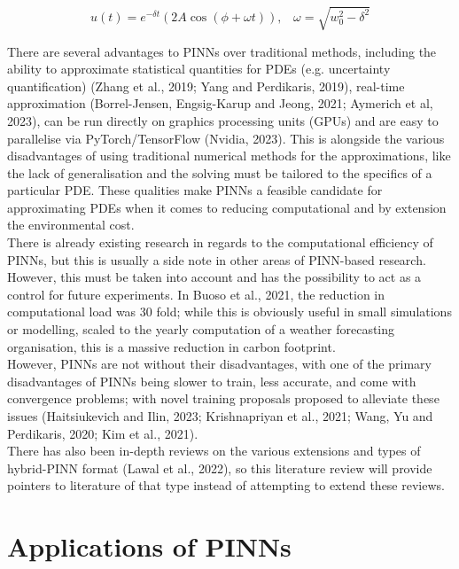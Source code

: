 \documentclass[12pt, openany]{book}
\begin{document}
\[
u(t)=e^{-\delta t}(2A\cos(\phi + \omega t)), \hspace{10pt} \omega = \sqrt{w_{0}^2-\delta^2}
\]

There are several advantages to PINNs over traditional methods, including the ability to approximate statistical quantities for PDEs (e.g. uncertainty quantification) (Zhang et al., 2019; Yang and Perdikaris, 2019), real-time approximation (Borrel-Jensen, Engsig-Karup and Jeong, 2021; Aymerich et al, 2023), can be run directly on graphics processing units (GPUs) and are easy to parallelise via PyTorch/TensorFlow (Nvidia, 2023). This is alongside the various disadvantages of using traditional numerical methods for the approximations, like the lack of generalisation and the solving must be tailored to the specifics of a particular PDE. These qualities make PINNs a feasible candidate for approximating PDEs when it comes to reducing computational and by extension the environmental cost. \\

There is already existing research in regards to the computational efficiency of PINNs, but this is usually a side note in other areas of PINN-based research. However, this must be taken into account and has the possibility to act as a control for future experiments. In Buoso et al., 2021, the reduction in computational load was 30 fold; while this is obviously useful in small simulations or modelling, scaled to the yearly computation of a weather forecasting organisation, this is a massive reduction in carbon footprint. \\

However, PINNs are not without their disadvantages, with one of the primary disadvantages of PINNs being slower to train, less accurate, and come with convergence problems; with novel training proposals proposed to alleviate these issues (Haitsiukevich and Ilin, 2023; Krishnapriyan et al., 2021; Wang, Yu and Perdikaris, 2020; Kim et al., 2021). \\

There has also been in-depth reviews on the various extensions and types of hybrid-PINN format (Lawal et al., 2022), so this literature review will provide pointers to literature of that type instead of attempting to extend these reviews.

\section{Applications of PINNs}
\end{document}
